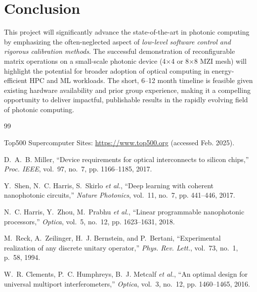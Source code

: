 \documentclass[conference]{IEEEtran}
\begin{document}
\section{Conclusion}
This project will significantly advance the state-of-the-art in photonic computing by emphasizing the often-neglected aspect of \emph{low-level software control and rigorous calibration methods}. The successful demonstration of reconfigurable matrix operations on a small-scale photonic device (4$\times$4 or 8$\times$8 MZI mesh) will highlight the potential for broader adoption of optical computing in energy-efficient HPC and ML workloads. The short, 6--12 month timeline is feasible given existing hardware availability and prior group experience, making it a compelling opportunity to deliver impactful, publishable results in the rapidly evolving field of photonic computing.


\begin{thebibliography}{99}

Top500 Supercomputer Sites: \url{https://www.top500.org} (accessed Feb. 2025).

D.~A.~B. Miller, ``Device requirements for optical interconnects to silicon chips,'' \emph{Proc. IEEE}, vol.~97, no.~7, pp. 1166--1185, 2017.

Y.~Shen, N.~C. Harris, S.~Skirlo \emph{et al.}, ``Deep learning with coherent nanophotonic circuits,'' \emph{Nature Photonics}, vol.~11, no.~7, pp. 441--446, 2017.

N.~C. Harris, Y.~Zhou, M.~Prabhu \emph{et al.}, ``Linear programmable nanophotonic processors,'' \emph{Optica}, vol.~5, no.~12, pp. 1623--1631, 2018.

M.~Reck, A.~Zeilinger, H.~J. Bernstein, and P.~Bertani, ``Experimental realization of any discrete unitary operator,'' \emph{Phys. Rev. Lett.}, vol.~73, no.~1, p.~58, 1994.

W.~R. Clements, P.~C. Humphreys, B.~J. Metcalf \emph{et al.}, ``An optimal design for universal multiport interferometers,'' \emph{Optica}, vol.~3, no.~12, pp. 1460--1465, 2016.

\end{thebibliography}
\end{document}
